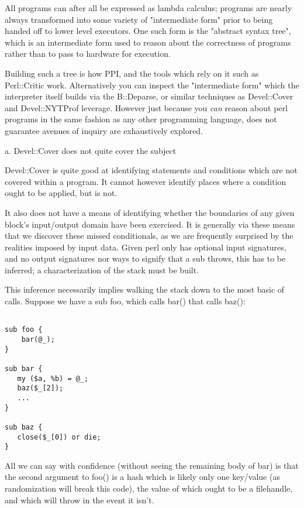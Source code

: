 \documentclass[twoside]{article}
\begin{document}
All programs can after all be expressed as lambda calculus; programs are nearly always transformed into some variety of "intermediate form" prior to being handed off to lower level executors.
One such form is the "abstract syntax tree", which is an intermediate form used to reason about the correctness of programs rather than to pass to hardware for execution.

Building such a tree is how PPI, and the tools which rely on it such as Perl::Critic work.
Alternatively you can inspect the "intermediate form" which the interpreter itself builds via the B::Deparse, or similar techniques as Devel::Cover and Devel::NYTProf leverage.
However just because you \textit{can} reason about perl programs in the same fashion as any other programming language, does not guarantee avenues of inquiry are exhaustively explored.

a. Devel::Cover does not quite cover the subject

Devel::Cover is quite good at identifying statements and conditions which are not covered within a program.
It cannot however identify places where a condition ought to be applied, but is not.

It also does not have a means of identifying whether the boundaries of any given block's input/output domain have been exercised.
It is generally via these means that we discover these missed conditionals, as we are frequently surprised by the realities imposed by input data.
Given perl only has optional input signatures, and no output signatures nor ways to signify that a sub throws, this has to be inferred; a characterization of the stack must be built.

This inference necessarily implies walking the stack down to the most basic of calls.
Suppose we have a sub foo, which calls bar() that calls baz():

\begin{lstlisting}

sub foo {
    bar(@_);
}

sub bar {
   my ($a, %b) = @_;
   baz($_[2]);
   ...
}

sub baz {
   close($_[0]) or die;
}

\end{lstlisting}

All we can say with confidence (without seeing the remaining body of bar) is that the second argument to foo() is a hash which is likely only one key/value (as randomization will break this code), the value of which ought to be a filehandle, and which will throw in the event it isn't.
\end{document}
